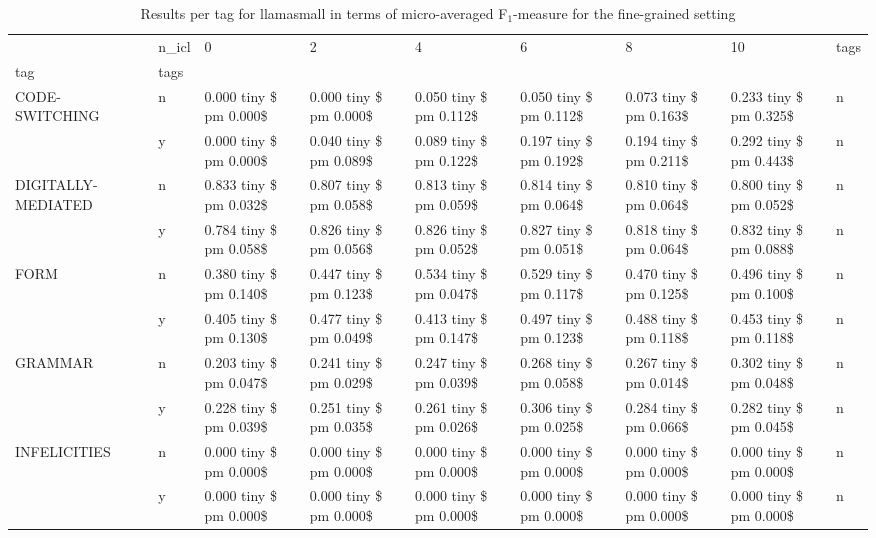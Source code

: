 \begin{table}
\caption{Results per tag for llamasmall in terms of micro-averaged F$_1$-measure for the fine-grained setting}
\label{tab:coarse-tags}
\begin{tabular}{lllllllll}
\toprule
 & n_icl & 0 & 2 & 4 & 6 & 8 & 10 & tags \\
tag & tags &  &  &  &  &  &  &  \\
\midrule
\multirow[t]{2}{*}{CODE-SWITCHING} & n & 0.000 tiny \$ pm 0.000\$ & 0.000 tiny \$ pm 0.000\$ & 0.050 tiny \$ pm 0.112\$ & 0.050 tiny \$ pm 0.112\$ & 0.073 tiny \$ pm 0.163\$ & 0.233 tiny \$ pm 0.325\$ & n \\
 & y & 0.000 tiny \$ pm 0.000\$ & 0.040 tiny \$ pm 0.089\$ & 0.089 tiny \$ pm 0.122\$ & 0.197 tiny \$ pm 0.192\$ & 0.194 tiny \$ pm 0.211\$ & 0.292 tiny \$ pm 0.443\$ & n \\
\cline{1-9}
\multirow[t]{2}{*}{DIGITALLY-MEDIATED} & n & 0.833 tiny \$ pm 0.032\$ & 0.807 tiny \$ pm 0.058\$ & 0.813 tiny \$ pm 0.059\$ & 0.814 tiny \$ pm 0.064\$ & 0.810 tiny \$ pm 0.064\$ & 0.800 tiny \$ pm 0.052\$ & n \\
 & y & 0.784 tiny \$ pm 0.058\$ & 0.826 tiny \$ pm 0.056\$ & 0.826 tiny \$ pm 0.052\$ & 0.827 tiny \$ pm 0.051\$ & 0.818 tiny \$ pm 0.064\$ & 0.832 tiny \$ pm 0.088\$ & n \\
\cline{1-9}
\multirow[t]{2}{*}{FORM} & n & 0.380 tiny \$ pm 0.140\$ & 0.447 tiny \$ pm 0.123\$ & 0.534 tiny \$ pm 0.047\$ & 0.529 tiny \$ pm 0.117\$ & 0.470 tiny \$ pm 0.125\$ & 0.496 tiny \$ pm 0.100\$ & n \\
 & y & 0.405 tiny \$ pm 0.130\$ & 0.477 tiny \$ pm 0.049\$ & 0.413 tiny \$ pm 0.147\$ & 0.497 tiny \$ pm 0.123\$ & 0.488 tiny \$ pm 0.118\$ & 0.453 tiny \$ pm 0.118\$ & n \\
\cline{1-9}
\multirow[t]{2}{*}{GRAMMAR} & n & 0.203 tiny \$ pm 0.047\$ & 0.241 tiny \$ pm 0.029\$ & 0.247 tiny \$ pm 0.039\$ & 0.268 tiny \$ pm 0.058\$ & 0.267 tiny \$ pm 0.014\$ & 0.302 tiny \$ pm 0.048\$ & n \\
 & y & 0.228 tiny \$ pm 0.039\$ & 0.251 tiny \$ pm 0.035\$ & 0.261 tiny \$ pm 0.026\$ & 0.306 tiny \$ pm 0.025\$ & 0.284 tiny \$ pm 0.066\$ & 0.282 tiny \$ pm 0.045\$ & n \\
\cline{1-9}
\multirow[t]{2}{*}{INFELICITIES} & n & 0.000 tiny \$ pm 0.000\$ & 0.000 tiny \$ pm 0.000\$ & 0.000 tiny \$ pm 0.000\$ & 0.000 tiny \$ pm 0.000\$ & 0.000 tiny \$ pm 0.000\$ & 0.000 tiny \$ pm 0.000\$ & n \\
 & y & 0.000 tiny \$ pm 0.000\$ & 0.000 tiny \$ pm 0.000\$ & 0.000 tiny \$ pm 0.000\$ & 0.000 tiny \$ pm 0.000\$ & 0.000 tiny \$ pm 0.000\$ & 0.000 tiny \$ pm 0.000\$ & n \\

\end{tabular}
\end{table}
